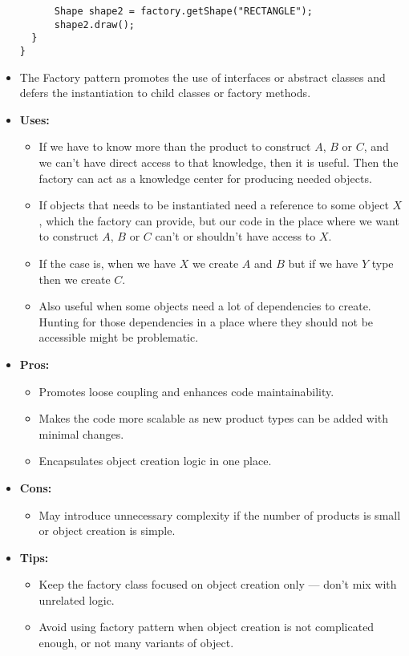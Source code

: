 \documentclass[12pt]{article}
\begin{document}
\begin{itemize}
\begin{lstlisting}
      Shape shape2 = factory.getShape("RECTANGLE");
      shape2.draw();
  }
}
          \end{lstlisting}
    \item The Factory pattern promotes the use of interfaces or abstract classes and defers the instantiation to child classes or factory methods.
    \item \textbf{Uses:}
    \begin{itemize}
      \item If we have to know more than the product to construct $A$, $B$ or $C$, and we can't have direct access to that knowledge, then it is useful. Then the factory can act as a knowledge center for producing needed objects.
      \item If objects that needs to be instantiated need a reference to some object $X$, which the factory can provide, but our code in the place where we want to construct $A$, $B$ or $C$ can't or shouldn't have access to $X$.
      \item If the case is, when we have $X$ we create $A$ and $B$ but if we have $Y$ type then we create $C$.
      \item Also useful when some objects need a lot of dependencies to create. Hunting for those dependencies in a place where they should not be accessible might be problematic.
    \end{itemize}
    \item \textbf{Pros:}
    \begin{itemize}
          \item Promotes loose coupling and enhances code maintainability.
          \item Makes the code more scalable as new product types can be added with minimal changes.
          \item Encapsulates object creation logic in one place.
    \end{itemize}
    \item \textbf{Cons:}
    \begin{itemize}
          \item May introduce unnecessary complexity if the number of products is small or object creation is simple.
    \end{itemize}
    \item \textbf{Tips:}
    \begin{itemize}
          \item Keep the factory class focused on object creation only — don't mix with unrelated logic.
          \item Avoid using factory pattern when object creation is not complicated enough, or not many variants of object.
    \end{itemize}
\end{itemize}
\newpage
\printindex
\end{document}
